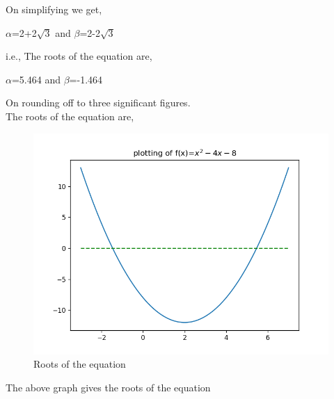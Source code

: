 \documentclass[journal,12pt,twocolumn]{IEEEtran}
\begin{document}
On simplifying we get,
\begin{center}
$\alpha$=2+2$\sqrt{3}$  and $\beta$=2-2$\sqrt{3}$ 
\end{center}
i.e., The roots of the equation are,
\begin{center}
$\alpha$=5.464 and $\beta$=-1.464
\end{center}
On rounding off to three significant figures.
\\The roots of the equation are,
\begin{center}
\end{center}
\begin{figure}[h] \includegraphics[scale=0.65]{Figure_0}\large \caption{Roots of the equation}
\end{figure}

\noindent The above graph gives the roots of the equation

 
\end{document}
